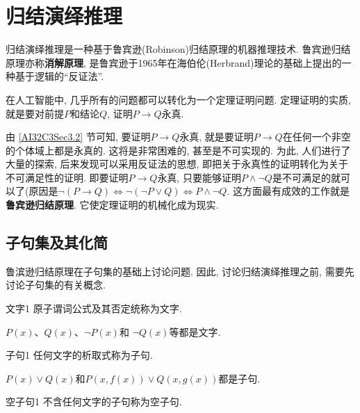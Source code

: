 \section{归结演绎推理}
归结演绎推理是一种基于鲁宾逊(Robinson)归结原理的机器推理技术. 鲁宾逊归结原理亦称\textbf{消解原理}, 是鲁宾逊于1965年在海伯伦(Herbrand)理论的基础上提出的一种基于逻辑的“反证法”.

在人工智能中, 几乎所有的问题都可以转化为一个定理证明问题. 定理证明的实质, 就是要对前提$P$和结论$Q$, 证明$P\rightarrow Q$永真.

由 \ref{AI32C3Sec3.2} 节可知, 要证明$P\rightarrow Q$永真, 就是要证明$P\rightarrow Q$在任何一个非空的个体域上都是永真的. 这将是非常困难的, 甚至是不可实现的.
为此, 人们进行了大量的探索, 后来发现可以采用反证法的思想, 即把关于永真性的证明转化为关于不可满足性的证明.
即要证明$P\rightarrow Q$永真, 只要能够证明$P\wedge \neg Q$是不可满足的就可以了(原因是$\neg (P\rightarrow Q) \Leftrightarrow \neg (\neg  P\vee Q) \Leftrightarrow  P\wedge \neg Q$.
这方面最有成效的工作就是\textbf{鲁宾逊归结原理}. 它使定理证明的机械化成为现实.
\subsection{子句集及其化简}

鲁滨逊归结原理在子句集的基础上讨论问题. 因此, 讨论归结演绎推理之前, 需要先讨论子句集的有关概念.

\begin{mydef}{文字}{1}
原子谓词公式及其否定统称为文字.
\end{mydef}

\begin{example}
  $P(x)$、$Q(x)$、$\neg  P(x)$和 $\neg Q(x)$等都是文字.
\end{example}

\begin{mydef}{子句}{1}
   任何文字的析取式称为子句.
\end{mydef}

\begin{example}
  $P(x)\vee Q(x)$和$P(x, f(x))\vee Q(x,g(x))$都是子句.
\end{example}

\begin{mydef}{空子句}{1}
   不含任何文字的子句称为空子句.
\end{mydef}

